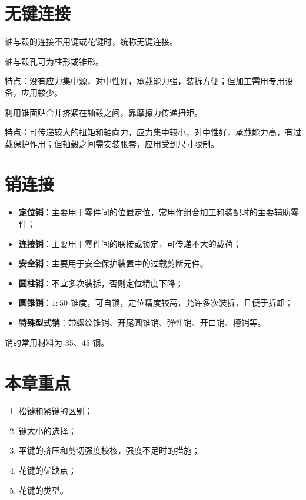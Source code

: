 \section{无键连接}
\label{sec:无键连接}

轴与毂的连接不用键或花键时，统称无键连接。

\begin{definition}
\label{def:型面连接}
轴与毂孔可为柱形或锥形。

特点：没有应力集中源，对中性好，承载能力强，装拆方便；但加工需用专用设备，应用较少。
\end{definition}

\begin{definition}[胀紧连接]
\label{def:胀紧连接}
利用锥面贴合并挤紧在轴毂之间，靠摩擦力传递扭矩。

特点：可传递较大的扭矩和轴向力，应力集中较小，对中性好，承载能力高，有过载保护作用；但轴毂之间需安装胀套，应用受到尺寸限制。
\end{definition}

\section{销连接}
\label{sec:销连接}

\begin{definition}[销按用途分类]
\label{def:销按用途}
\begin{itemize}
	\item \textbf{定位销}：主要用于零件间的位置定位，常用作组合加工和装配时的主要辅助零件；
	\item \textbf{连接销}：主要用于零件间的联接或锁定，可传递不大的载荷；
	\item \textbf{安全销}：主要用于安全保护装置中的过载剪断元件。
\end{itemize}
\end{definition}

\begin{definition}[销按结构形式分类]
\label{def:销按结构}
\begin{itemize}
	\item \textbf{圆柱销}：不宜多次装拆，否则定位精度下降；
	\item \textbf{圆锥销}：$1:50$ 锥度，可自锁，定位精度较高，允许多次装拆，且便于拆卸；
	\item \textbf{特殊型式销}：带螺纹锥销、开尾圆锥销、弹性销、开口销、槽销等。
\end{itemize}

销的常用材料为 35、45 钢。
\end{definition}

\section*{本章重点}

\begin{enumerate}
	\item 松键和紧键的区别；
	\item 键大小的选择；
	\item 平键的挤压和剪切强度校核，强度不足时的措施；
	\item 花键的优缺点；
	\item 花键的类型。
\end{enumerate}
